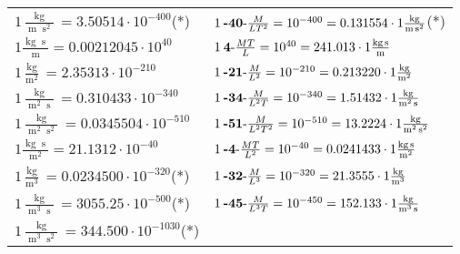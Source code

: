 \begin{center}
\begin{longtable}{l l}
{\color{black}$1 \bm{\mathrm{ }}\frac{\operatorname{kg}}{\operatorname{m}\operatorname{s}^2} = 3.50514\cdot10^{-400} $}\quad(*)&
	{\color{black}$1\:\text{\textbf{-40}-} \frac{M}{LT^2}=10^{-400} = 0.131554 \cdot 1 \bm{\mathrm{ }}\frac{\operatorname{kg}}{\operatorname{m}\operatorname{s}^2}$}\quad(*)\\
{\color{black}$1 \bm{\mathrm{ }}\frac{\operatorname{kg}\operatorname{s}}{\operatorname{m}} = 0.00212045\cdot10^{40} $}&
	{\color{black}$1\:\text{\textbf{4}-} \frac{MT}{L}=10^{40} = 241.013 \cdot 1 \bm{\mathrm{ }}\frac{\operatorname{kg}\operatorname{s}}{\operatorname{m}}$}\\
{\color{black}$1 \bm{\mathrm{ }}\frac{\operatorname{kg}}{\operatorname{m}^2} = 2.35313\cdot10^{-210} $}&
	{\color{black}$1\:\text{\textbf{-21}-} \frac{M}{L^2}=10^{-210} = 0.213220 \cdot 1 \bm{\mathrm{ }}\frac{\operatorname{kg}}{\operatorname{m}^2}$}\\
{\color{black}$1 \bm{\mathrm{ }}\frac{\operatorname{kg}}{\operatorname{m}^2\operatorname{s}} = 0.310433\cdot10^{-340} $}&
	{\color{black}$1\:\text{\textbf{-34}-} \frac{M}{L^2T}=10^{-340} = 1.51432 \cdot 1 \bm{\mathrm{ }}\frac{\operatorname{kg}}{\operatorname{m}^2\operatorname{s}}$}\\
{\color{black}$1 \bm{\mathrm{ }}\frac{\operatorname{kg}}{\operatorname{m}^2\operatorname{s}^2} = 0.0345504\cdot10^{-510} $}&
	{\color{black}$1\:\text{\textbf{-51}-} \frac{M}{L^2T^2}=10^{-510} = 13.2224 \cdot 1 \bm{\mathrm{ }}\frac{\operatorname{kg}}{\operatorname{m}^2\operatorname{s}^2}$}\\
{\color{black}$1 \bm{\mathrm{ }}\frac{\operatorname{kg}\operatorname{s}}{\operatorname{m}^2} = 21.1312\cdot10^{-40} $}&
	{\color{black}$1\:\text{\textbf{-4}-} \frac{MT}{L^2}=10^{-40} = 0.0241433 \cdot 1 \bm{\mathrm{ }}\frac{\operatorname{kg}\operatorname{s}}{\operatorname{m}^2}$}\\
{\color{black}$1 \bm{\mathrm{ }}\frac{\operatorname{kg}}{\operatorname{m}^3} = 0.0234500\cdot10^{-320} $}\quad(*)&
	{\color{black}$1\:\text{\textbf{-32}-} \frac{M}{L^3}=10^{-320} = 21.3555 \cdot 1 \bm{\mathrm{ }}\frac{\operatorname{kg}}{\operatorname{m}^3}$}\\
{\color{black}$1 \bm{\mathrm{ }}\frac{\operatorname{kg}}{\operatorname{m}^3\operatorname{s}} = 3055.25\cdot10^{-500} $}\quad(*)&
	{\color{black}$1\:\text{\textbf{-45}-} \frac{M}{L^3T}=10^{-450} = 152.133 \cdot 1 \bm{\mathrm{ }}\frac{\operatorname{kg}}{\operatorname{m}^3\operatorname{s}}$}\\
{\color{black}$1 \bm{\mathrm{ }}\frac{\operatorname{kg}}{\operatorname{m}^3\operatorname{s}^2} = 344.500\cdot10^{-1030} $}\quad(*)&

\end{longtable}
\end{center}
